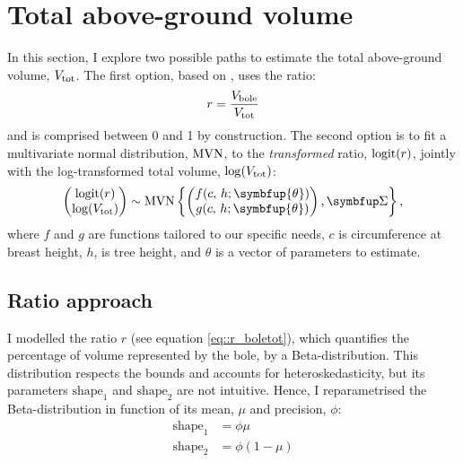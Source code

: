 \chapter{Total above-ground volume\label{chap::total_v}}

In this section, I explore two possible paths to estimate the total above-ground volume, \( V_{\text{tot}} \). The first option, based on \cite{Longuetaud2013}, uses the ratio:
\begin{equation}
	r = \frac{V_{\text{bole}}}{V_{\text{tot}}} \label{eq::r_boletot}
\end{equation}
and is comprised between 0 and 1 by construction. The second option is to fit a multivariate normal distribution, \( \operatorname{MVN} \), to the \textit{transformed} ratio, \( \operatorname{logit}(r) \), jointly with the log-transformed total volume, \( \log(V_{\text{tot}}) \):
\begin{equation}
	\begin{pmatrix}
		\logit(r) \\
		\log(\Vtot)
	\end{pmatrix}
	\sim
	\MVN\left\{ \begin{pmatrix}
		f(c, \, h; \symbfup{\theta}) \\
		g(c, \, h; \symbfup{\theta}) \\
	\end{pmatrix}, \Sigmabf \right\},
	\label{eq::mvn}
\end{equation}
where \( f \) and \( g \) are functions tailored to our specific needs, \( c \) is circumference at breast height, \( h \), is tree height, and \( \theta \) is a vector of parameters to estimate.

\section{Ratio approach}

I modelled the ratio \( r \) (see equation \eqref{eq::r_boletot}), which quantifies the percentage of volume represented by the bole, by a Beta-distribution. This distribution respects the bounds and accounts for heteroskedasticity, but its parameters \( \text{shape}_1 \) and \( \text{shape}_2 \) are not intuitive. Hence, I reparametrised the Beta-distribution in function of its mean, \( \mu \) and precision, \( \phi \):
\begin{align*}
	\text{shape}_1 &= \phi \mu \\
	\text{shape}_2 &= \phi (1 - \mu)
\end{align*}


